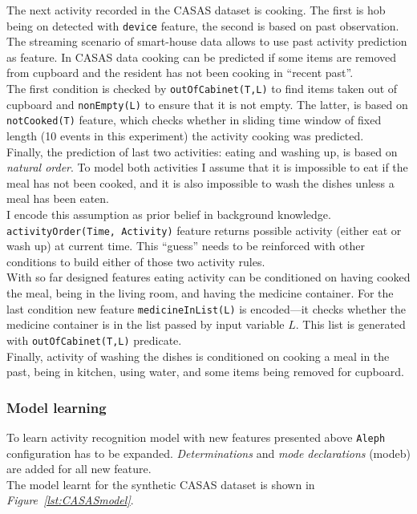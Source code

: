 \documentclass[10pt, a4paper, pdflatex, leqno, twoside, openright]{report}
\begin{document}
The next activity recorded in the CASAS dataset is cooking. The first is hob being on detected with \texttt{device} feature, the second is based on past observation. The streaming scenario of smart-house data allows to use past activity prediction as feature. In CASAS data cooking can be predicted if some items are removed from cupboard and the resident has not been cooking in ``recent past''.\\
The first condition is checked by \texttt{outOfCabinet(T,L)} to find items taken out of cupboard and \texttt{nonEmpty(L)} to ensure that it is not empty. The latter, is based on \texttt{notCooked(T)} feature, which checks whether in sliding time window of fixed length (10 events in this experiment) the activity cooking was predicted.\\

Finally, the prediction of last two activities: eating and washing up, is based on \emph{natural order}. To model both activities I assume that it is impossible to eat if the meal has not been cooked, and it is also impossible to wash the dishes unless a meal has been eaten.\\
I encode this assumption as prior belief in background knowledge. \texttt{activityOrder(Time, Activity)} feature returns possible activity (either eat or wash up) at current time. This ``guess'' needs to be reinforced with other conditions to build either of those two activity rules.\\
With so far designed features eating activity can be conditioned on having cooked the meal, being in the living room, and having the medicine container. For the last condition new feature \texttt{medicineInList(L)} is encoded---it checks whether the medicine container is in the list passed by input variable $L$. This list is generated with \texttt{outOfCabinet(T,L)} predicate.\\
Finally, activity of washing the dishes is conditioned on cooking a meal in the past, being in kitchen, using water, and some items being removed for cupboard.

      \subsubsection{Model learning}
To learn activity recognition model with new features presented above \texttt{Aleph} configuration has to be expanded. \emph{Determinations} and \emph{mode declarations} (modeb) are added for all new feature.\\
The model learnt for the synthetic CASAS dataset is shown in \emph{Figure~\ref{lst:CASASmodel}}.
\end{document}
